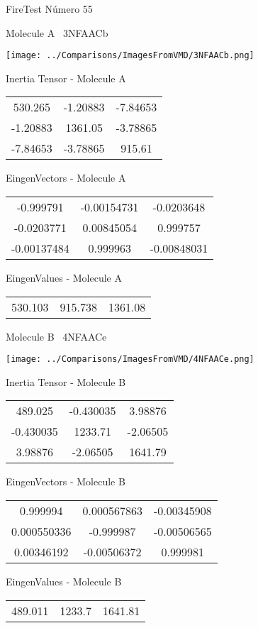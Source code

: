 \vtab[-3cm]
\begin{center}
{\large FireTest \tab Número 55}
\end{center}
\begin{multicols}{2}
\begin{center}

Molecule A \
3NFAACb

\texttt{[image: ../Comparisons/ImagesFromVMD/3NFAACb.png]}

Inertia Tensor - Molecule A \\
\begin{tabular}{|c c c|}
530.265	 & 	-1.20883	 & 	-7.84653	 \\
-1.20883	 & 	1361.05	 & 	-3.78865	 \\
-7.84653	 & 	-3.78865	 & 	915.61
\end{tabular}

\vtab
 EingenVectors - Molecule A     \\
\begin{tabular}{|c c c|}
-0.999791	 & 	-0.00154731	 & 	-0.0203648	 \\
-0.0203771	 & 	0.00845054	 & 	0.999757	 \\
-0.00137484	 & 	0.999963	 & 	-0.00848031
\end{tabular}

\vtab
 EingenValues - Molecule A     \\
\begin{tabular}{|c c c|}
530.103	 & 	915.738	 & 	1361.08	 \\
\end{tabular}
\columnbreak

Molecule B \
4NFAACe

\texttt{[image: ../Comparisons/ImagesFromVMD/4NFAACe.png]}

Inertia Tensor - Molecule B \\
\begin{tabular}{|c c c|}
489.025	 & 	-0.430035	 & 	3.98876	 \\
-0.430035	 & 	1233.71	 & 	-2.06505	 \\
3.98876	 & 	-2.06505	 & 	1641.79
\end{tabular}

\vtab
 EingenVectors - Molecule B     \\
\begin{tabular}{|c c c|}
0.999994	 & 	0.000567863	 & 	-0.00345908	 \\
0.000550336	 & 	-0.999987	 & 	-0.00506565	 \\
0.00346192	 & 	-0.00506372	 & 	0.999981
\end{tabular}

\vtab
 EingenValues - Molecule B     \\
\begin{tabular}{|c c c|}
489.011	 & 	1233.7	 & 	1641.81	 \\
\end{tabular}

\end{center}
\end{multicols}

